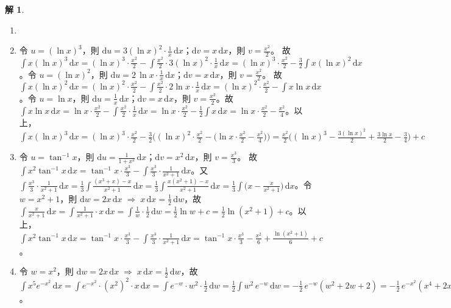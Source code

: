 \documentclass[12pt]{extarticle}
\newcommand{\ds}{\displaystyle}
\newcommand{\ie}{\;\Longrightarrow\;}
\theoremstyle{definition}
\newtheorem*{sol}{解}
\begin{document}
\begin{sol}
  \begin{enumerate}\setlength\itemsep{0em}
    \item[]
    \item 令 $\ds u = (\ln x)^3$，則 $\ds\text{d}u = 3(\ln x)^2\cdot\frac{1}{x}\,\text{d}x$；$\ds\text{d}v = x\,\text{d}x$，則 $\ds v = \frac{x^2}{2}$。 故 $\ds\int x(\ln x)^3\,\mathrm{d}x = (\ln x)^3\cdot\frac{x^2}{2} - \int\frac{x^2}{2}\cdot 3(\ln x)^2\cdot\frac{1}{x}\,\text{d}x = (\ln x)^3\cdot\frac{x^2}{2} - \frac{3}{2}\int x(\ln x)^2\,\text{d}x$。令 $\ds u = (\ln x)^2$，則 $\ds\text{d}u = 2\,\ln x\cdot\frac{1}{x}\,\text{d}x$；$\ds\text{d}v = x\,\text{d}x$，則 $\ds v = \frac{x^2}{2}$。 故 $\ds\int x(\ln x)^2\,\text{d}x = (\ln x)^2\cdot\frac{x^2}{2} - \int\frac{x^2}{2}\cdot 2\ln x\cdot\frac{1}{x}\,\text{d}x = (\ln x)^2\cdot\frac{x^2}{2} - \int x\ln x\,\text{d}x$。令 $\ds u = \ln x$，則 $\ds\text{d}u = \frac{1}{x}\,\text{d}x$；$\ds\text{d}v = x\,\text{d}x$，則 $\ds v = \frac{x^2}{2}$。故 $\ds\int x\ln x\,\text{d}x = \ln x\cdot\frac{x^2}{2} - \int\frac{x^2}{2}\cdot\frac{1}{x}\,\text{d}x = \ln x\cdot\frac{x^2}{2} - \frac{1}{2}\int x\,\text{d}x = \ln x\cdot\frac{x^2}{2} - \frac{x^2}{4}$。以上，$\ds\int x(\ln x)^3\,\mathrm{d}x = (\ln x)^3\cdot\frac{x^2}{2} - \frac{3}{2}\Big((\ln x)^2\cdot\frac{x^2}{2} - \big(\ln x\cdot\frac{x^2}{2} - \frac{x^2}{4}\big)\Big) = \frac{x^2}{2}\big((\ln x)^3 - \frac{3(\ln x)^2}{2} + \frac{3\ln x}{2} - \frac{3}{4}\big) + c$
    \item 令 $\ds u = \tan^{-1} x$，則 $\ds\text{d}u = \frac{1}{1 + x^2}\,\text{d}x$；$\ds\text{d}v = x^2\,\text{d}x$，則 $\ds v = \frac{x^3}{3}$。 故 $\ds\int x^2\tan^{-1} x\,\mathrm{d}x = \tan^{-1}x\cdot\frac{x^3}{3} - \int\frac{x^3}{3}\cdot\frac{1}{x^2 + 1}\,\text{d}x$。又 $\ds\int\frac{x^3}{3}\cdot\frac{1}{x^2 + 1}\,\text{d}x = \frac{1}{3}\int\frac{(x^3 + x) - x}{x^2 + 1}\,\text{d}x = \frac{1}{3}\int\frac{x(x^2 + 1) - x}{x^2 + 1}\,\text{d}x = \frac{1}{3}\int\big(x - \frac{x}{x^2 + 1}\big)\,\text{d}x$。令 $\ds w = x^2 + 1$，則 $\ds\text{d}w = 2x\,\text{d}x\ie x\,\text{d}x = \frac{1}{2}\,\text{d}w$，故 $\ds\int\frac{x}{x^2 + 1}\,\text{d}x = \int\frac{1}{x^2 + 1}\cdot x\,\text{d}x = \int\frac{1}{w}\cdot\frac{1}{2}\,\text{d}w = \frac{1}{2}\ln w + c = \frac{1}{2}\ln(x^2 + 1) + c$。以上，$\ds\int x^2\tan^{-1} x\,\mathrm{d}x = \tan^{-1}x\cdot\frac{x^3}{3} - \int\frac{x^3}{3}\cdot\frac{1}{x^2 + 1}\,\text{d}x = \tan^{-1}x\cdot\frac{x^3}{3} - \frac{x^2}{6} + \frac{\ln(x^2 + 1)}{6} + c$。
    \item 令 $\ds w = x^2$，則 $\ds\text{d}w = 2x\,\text{d}x\ie x\,\text{d}x = \frac{1}{2}\,\text{d}w$，故 $\ds\int x^5 e^{-x^2}\,\text{d}x = \int e^{-x^2}\cdot(x^2)^2\cdot x\,\text{d}x = \int e^{-w}\cdot w^2\cdot\frac{1}{2}\,\text{d}w = \frac{1}{2}\int w^2\,e^{-w}\,\text{d}w = -\frac{1}{2}\,e^{-w}(w^2 + 2w + 2) = -\frac{1}{2}\,e^{-x^2}(x^4 + 2x^2 + 2) + c$。\\

\end{enumerate}
\end{sol}
\end{document}
